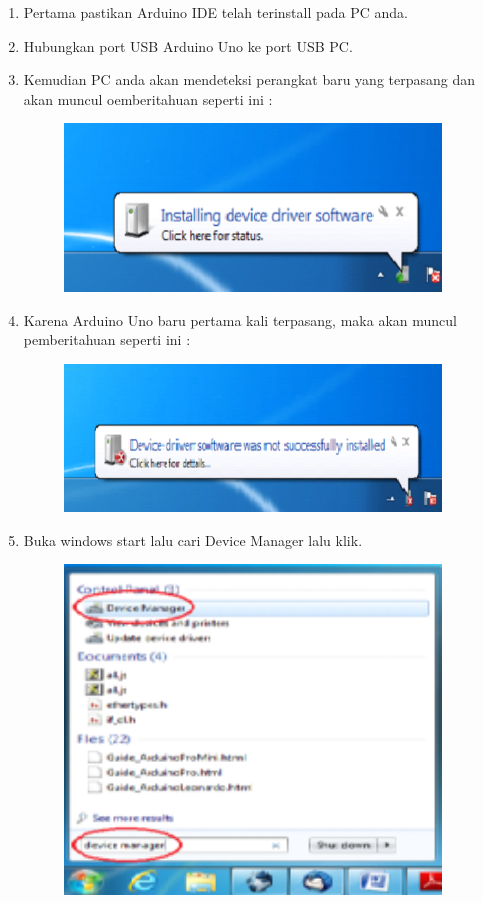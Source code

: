 \begin{enumerate}
	\item Pertama pastikan Arduino IDE telah terinstall pada PC anda.
	\item Hubungkan port USB Arduino Uno ke port USB PC.
	\item Kemudian PC anda akan mendeteksi perangkat baru yang terpasang dan akan muncul oemberitahuan seperti ini : 
	\begin{figure}[H]
		\includegraphics[width=10cm]{figures/5/1174021/Teori/1.png}
		\centering
	\end{figure}
	\item Karena Arduino Uno baru pertama kali terpasang, maka akan muncul pemberitahuan seperti ini :
	\begin{figure}[H]
		\includegraphics[width=10cm]{figures/5/1174021/Teori/2.png}
		\centering
	\end{figure}
	\item Buka windows start lalu cari Device Manager lalu klik.
	\begin{figure}[H]
		\includegraphics[width=10cm]{figures/5/1174021/Teori/3.png}

\end{figure}
\end{enumerate}
